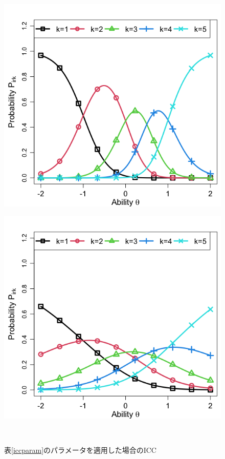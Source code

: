 \documentclass[a4paper,11pt,oneside,openany]{jsbook}
\begin{document}
\begin{center}
\begin{figure}[]
\begin{minipage}[b]{0.3\linewidth}
    \label{4}
  \end{minipage}
  \begin{minipage}[b]{0.3\linewidth}
    \centering
    \includegraphics[keepaspectratio,scale=0.22]{img/icc5.png}
    \label{5}
  \end{minipage}
  \begin{minipage}[b]{0.3\linewidth}
    \centering
    \includegraphics[keepaspectratio,scale=0.22]{img/icc6.png}
    \label{6}
  \end{minipage}\\
  \caption{表\ref{iccparam}のパラメータを適用した場合のICC}\label{icc}
  \end{figure}
\end{center}
\end{document}
